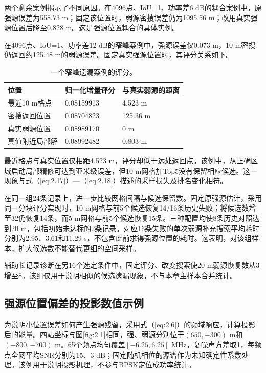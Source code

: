 \documentclass[11pt,a4paper]{article}
\numberwithin{equation}{section}
\numberwithin{figure}{section}
\numberwithin{table}{section}
\begin{document}
两个剩余案例揭示了不同原因。在4096点、IoU=1、功率差6 dB的耦合案例中，原强源误差为558.73 m；固定该位置时，弱源密搜误差仍为1095.56 m；改用真实强源位置后降至0.828 m。这是强源位置耦合的具体实例。

在4096点、IoU=1、功率差12 dB的窄峰案例中，强源误差仅0.073 m，10 m密搜仍返回约125.48 m的弱源误差。固定真实强源位置时，其评分关系如下。

\begin{table}[!htbp]
\centering
\caption{一个窄峰遗漏案例的评分。}\label{tab:3.7}
\small
\setlength{\tabcolsep}{4pt}
\renewcommand{\arraystretch}{1.2}
\begin{tabularx}{\linewidth}{Y{1.1}Y{1}Y{0.9}}
\toprule
\textbf{位置} & \textbf{归一化增量评分} & \textbf{与真实弱源的距离} \\
\midrule
最近10 m格点 & 0.08159913 & 4.523 m \\
密搜返回位置 & 0.08704823 & 125.36 m \\
真实弱源位置 & 0.08989170 & 0 m \\
真值附近局部解 & 0.08992482 & 0.803 m \\
\bottomrule
\end{tabularx}
\end{table}

最近格点与真实位置仅相距4.523 m，评分却低于远处返回点。该例中，从正确区域启动局部精修可达到亚米级误差，但10 m网格加Top5没有保留相应候选。这一现象与式（\ref{eq:2.17}）—（\ref{eq:2.18}）描述的采样损失及排名变化相符。

在同一组24条记录上，进一步比较网格间隔与候选保留数。固定原强源估计，采用同一分块评分实现时，10 m网格与前5个候选恢复14/16条历史失败；将候选数增至32仍恢复14条，而5 m网格与前5个候选恢复15条。三种配置均使8条历史对照达到20 m，包括初始未达标的2条记录。对应16条失败的单次弱源补充搜索平均耗时分别为2.95、3.61和11.29 s，不包含此前求得强源位置的耗时。这表明，对该组样本，扩大候选数不能替代更细的空间采样。

辅助长记录诊断在另16个选定条件中，固定评分、改变搜索使20 m弱源恢复数从3增至8。该组仅用于说明相似的候选遗漏现象，不与本章主样本合并统计。

\subsection{强源位置偏差的投影数值示例}\label{sec:3.7}

为说明小位置误差如何产生强源残留，采用式（\ref{eq:2.6}）的频域响应，计算投影后的能量。四站坐标与图\ref{fig:2.1}相同，强、弱源分别位于$(650,-300)$ m和$(-800,-700)$ m。65个频点均匀覆盖$[-6.25,6.25]$ MHz，复噪声方差取1，每频点全网平均SNR分别为15、3 dB；固定随机相位的源谱作为未知确定性系数处理。该例用于说明投影机理，不参与BPSK定位成功率统计。
\end{document}
